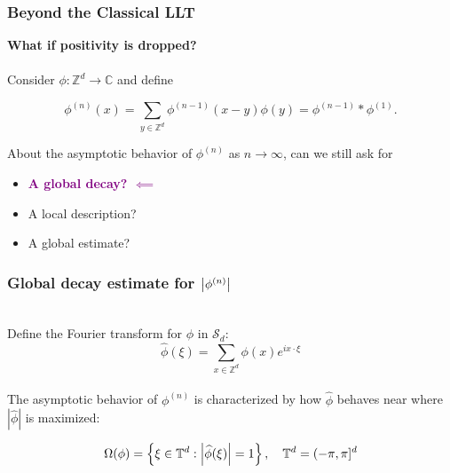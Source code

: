 \documentclass{beamer}
\theoremstyle{definition}
\begin{document}
\begin{frame}
\frametitle{Beyond the Classical LLT}
\textbf{What if positivity is dropped?}\\
$\,$\\

Consider $\phi: \mathbb{Z}^d \to \mathbb{C}$ and define 

\begin{equation*}
\phi^{(n)}(x)=\sum_{y\in\mathbb{Z}^d}\phi^{(n-1)}(x-y)\phi(y) = \phi^{(n-1)}\ast \phi^{(1)}.
\end{equation*}

%


About the asymptotic behavior of $\phi^{(n)}$ as $n\to \infty$, can we still ask for
\begin{itemize}
	\item \textcolor{purple}{\textbf{A global decay? $\impliedby$}} 
	\item A local description?
	\item A global estimate?
\end{itemize}



\pause

\centering{\textbf{\textcolor{purple}{HOW?}}}


\end{frame}







\begin{frame}
\frametitle{Global decay estimate for $\abs{\phi^{(n)}}$}



\begin{center}
\end{center}
$\,$\\


Define the Fourier transform for $\phi$ in $\mathcal{S}_d$:
\begin{equation*}
\widehat{\phi}(\xi)=\sum_{x\in\mathbb{Z}^d}\phi(x)e^{ix\cdot\xi}
\end{equation*}
$\,$\\
The asymptotic behavior of $\phi^{(n)}$ is characterized by how $\widehat{\phi}$ behaves near where $|\widehat{\phi}|$ is maximized:

\begin{equation*}
\Omega(\phi)=\left\{\xi\in \mathbb{T}^d:\abs{\widehat{\phi}(\xi)}=1\right\}, \quad \mathbb{T}^d=(-\pi,\pi]^d
\end{equation*}


\end{frame}
\end{document}
